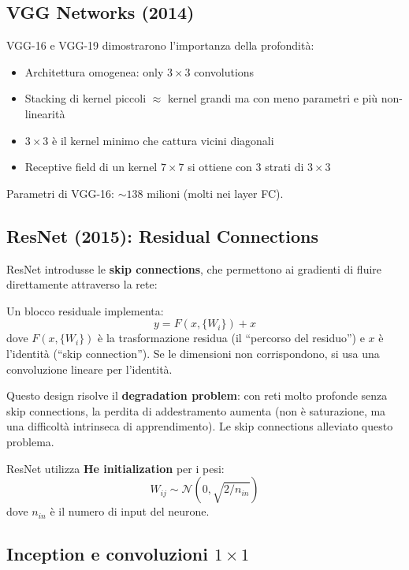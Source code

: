 \subsection{VGG Networks (2014)}

VGG-16 e VGG-19 dimostrarono l'importanza della profondità:
\begin{itemize}
\item Architettura omogenea: only $3 \times 3$ convolutions
\item Stacking di kernel piccoli $\approx$ kernel grandi ma con meno parametri e più non-linearità
\item $3 \times 3$ è il kernel minimo che cattura vicini diagonali
\item Receptive field di un kernel $7 \times 7$ si ottiene con 3 strati di $3 \times 3$
\end{itemize}

Parametri di VGG-16: $\sim 138$ milioni (molti nei layer FC).

\subsection{ResNet (2015): Residual Connections}

ResNet introdusse le \textbf{skip connections}, che permettono ai gradienti di fluire direttamente attraverso la rete:

\begin{definition}
Un blocco residuale implementa:
\[
y = F(x, \{W_i\}) + x
\]
dove $F(x, \{W_i\})$ è la trasformazione residua (il ``percorso del residuo'') e $x$ è l'identità (``skip connection''). Se le dimensioni non corrispondono, si usa una convoluzione lineare per l'identità.
\end{definition}

Questo design risolve il \textbf{degradation problem}: con reti molto profonde senza skip connections, la perdita di addestramento aumenta (non è saturazione, ma una difficoltà intrinseca di apprendimento). Le skip connections alleviato questo problema.

ResNet utilizza \textbf{He initialization} per i pesi:
\[
W_{ij} \sim \mathcal{N}(0, \sqrt{2/n_{in}})
\]
dove $n_{in}$ è il numero di input del neurone.

\subsection{Inception e convoluzioni $1 \times 1$}

